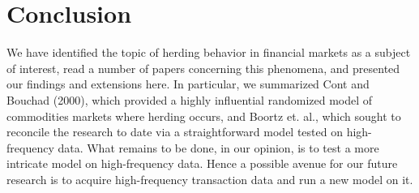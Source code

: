 \documentclass{article}
\begin{document}
\section{Conclusion}
We have identified the topic of herding behavior in financial markets as a subject of interest, read a number of papers concerning this phenomena, and presented our findings and extensions here.
In particular, we summarized Cont and Bouchad (2000), which provided a highly influential randomized model of commodities markets where herding occurs, and Boortz et. al., which sought to reconcile the research to date via a straightforward model tested on high-frequency data.
What remains to be done, in our opinion, is to test a more intricate model on high-frequency data.
Hence a possible avenue for our future research is to acquire high-frequency transaction data and run a new model on it.



\end{document}
